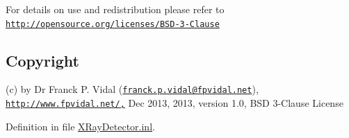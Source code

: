 For details on use and redistribution please refer to \href{http://opensource.org/licenses/BSD-3-Clause}{\tt http://opensource.org/licenses/BSD-\/3-\/Clause}\hypertarget{_x_ray_renderer_8inl_Copyright}{}\subsection{Copyright}\label{_x_ray_renderer_8inl_Copyright}
(c) by Dr Franck P. Vidal (\href{mailto:franck.p.vidal@fpvidal.net}{\tt franck.p.vidal@fpvidal.net}), \href{http://www.fpvidal.net/,}{\tt http://www.fpvidal.net/,} Dec 2013, 2013, version 1.0, BSD 3-\/Clause License 

Definition in file \hyperlink{_x_ray_detector_8inl_source}{XRayDetector.inl}.

